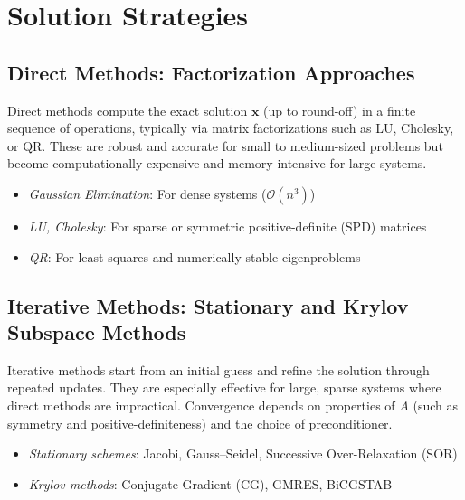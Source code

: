 \section{Solution Strategies}
\subsection[Direct Methods]{Direct Methods: Factorization Approaches}
Direct methods compute the exact solution $\mathbf{x}$ (up to round-off) in a finite sequence of operations, typically via matrix factorizations such as LU, Cholesky, or QR. These are robust and accurate for small to medium-sized problems but become computationally expensive and memory-intensive for large systems.

\begin{itemize}
    \item \emph{Gaussian Elimination}: For dense systems ($\mathcal{O}(n^{3})$)
    \item \emph{LU, Cholesky}: For sparse or symmetric positive-definite (SPD) matrices
    \item \emph{QR}: For least-squares and numerically stable eigenproblems
\end{itemize}

\subsection[Iterative Methods]{Iterative Methods: Stationary and Krylov Subspace Methods}
Iterative methods start from an initial guess and refine the solution through repeated updates. They are especially effective for large, sparse systems where direct methods are impractical. Convergence depends on properties of $A$ (such as symmetry and positive-definiteness) and the choice of preconditioner.

\begin{itemize}
    \item \emph{Stationary schemes}: Jacobi, Gauss--Seidel, Successive Over-Relaxation (SOR)
    \item \emph{Krylov methods}: Conjugate Gradient (CG), GMRES, BiCGSTAB
\end{itemize}

